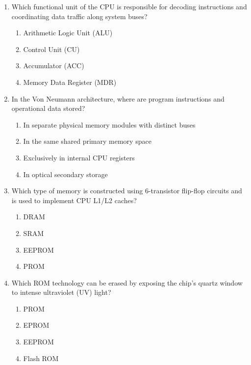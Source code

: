 \begin{enumerate}[leftmargin=1.5em]
    \item Which functional unit of the CPU is responsible for decoding instructions and coordinating data traffic along system buses?
    \begin{enumerate}[label=(\alph*)]
        \item Arithmetic Logic Unit (ALU)
        \item Control Unit (CU)
        \item Accumulator (ACC)
        \item Memory Data Register (MDR)
    \end{enumerate}

    \item In the Von Neumann architecture, where are program instructions and operational data stored?
    \begin{enumerate}[label=(\alph*)]
        \item In separate physical memory modules with distinct buses
        \item In the same shared primary memory space
        \item Exclusively in internal CPU registers
        \item In optical secondary storage
    \end{enumerate}

    \item Which type of memory is constructed using 6-transistor flip-flop circuits and is used to implement CPU L1/L2 caches?
    \begin{enumerate}[label=(\alph*)]
        \item DRAM
        \item SRAM
        \item EEPROM
        \item PROM
    \end{enumerate}

    \item Which ROM technology can be erased by exposing the chip's quartz window to intense ultraviolet (UV) light?
    \begin{enumerate}[label=(\alph*)]
        \item PROM
        \item EPROM
        \item EEPROM
        \item Flash ROM
    \end{enumerate}


\end{enumerate}
